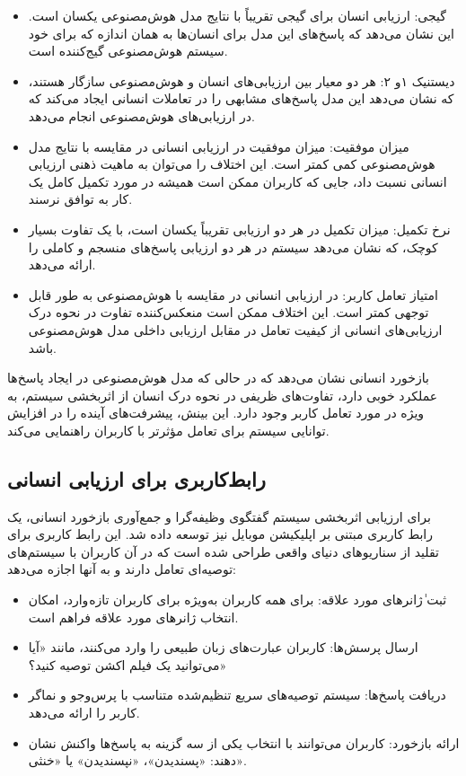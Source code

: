 \begin{itemize}
\item
گیجی: ارزیابی انسان برای گیجی تقریباً با نتایج مدل هوش‌مصنوعی یکسان است.
این نشان می‌دهد که پاسخ‌های این مدل برای انسان‌ها به همان اندازه که برای خود سیستم هوش‌مصنوعی گیج‌کننده است.
\item
دیستنیک ۱و ۲: هر دو معیار بین ارزیابی‌های انسان و هوش‌مصنوعی سازگار هستند، که نشان می‌دهد این مدل پاسخ‌های مشابهی را در تعاملات انسانی ایجاد می‌کند که در ارزیابی‌های هوش‌مصنوعی انجام می‌دهد.
\item
میزان موفقیت: میزان موفقیت در ارزیابی انسانی در مقایسه با نتایج مدل هوش‌مصنوعی کمی کمتر است. این اختلاف را می‌توان به ماهیت ذهنی ارزیابی انسانی نسبت داد، جایی که کاربران ممکن است همیشه در مورد تکمیل کامل یک کار به توافق نرسند.
\item
نرخ تکمیل: میزان تکمیل در هر دو ارزیابی تقریباً یکسان است، با یک تفاوت بسیار کوچک، که نشان می‌دهد سیستم در هر دو ارزیابی پاسخ‌های منسجم و کاملی را ارائه می‌دهد.
\item
 امتیاز تعامل کاربر: در ارزیابی انسانی در مقایسه با هوش‌مصنوعی به طور قابل ‌توجهی کمتر است. این اختلاف ممکن است منعکس‌کننده تفاوت در نحوه درک ارزیابی‌های انسانی از کیفیت تعامل در مقابل ارزیابی داخلی مدل هوش‌مصنوعی باشد.
\end{itemize}

بازخورد انسانی نشان می‌دهد که در حالی که مدل هوش‌مصنوعی در ایجاد پاسخ‌ها عملکرد خوبی دارد، تفاوت‌های ظریفی در نحوه درک انسان از اثربخشی سیستم، به ویژه در مورد تعامل کاربر وجود دارد. این بینش، پیشرفت‌های آینده را در افزایش توانایی سیستم برای تعامل مؤثرتر با کاربران راهنمایی می‌کند.

\subsection{رابط‌کاربری برای ارزیابی انسانی}

برای ارزیابی اثربخشی سیستم گفتگوی وظیفه‌گرا و جمع‌آوری بازخورد انسانی، یک رابط کاربری مبتنی بر اپلیکیشن موبایل نیز توسعه داده شد. این رابط کاربری برای تقلید از سناریوهای دنیای واقعی طراحی شده است که در آن کاربران با سیستم‌های توصیه‌ای تعامل دارند و به آنها اجازه می‌دهد:
\begin{itemize}
\item
ثبت ٰژانرهای مورد علاقه: برای همه کاربران به‌ویژه برای کاربران تازه وارد، امکان انتخاب ژانرهای مورد علاقه فراهم است.
\item
 ارسال پرسش‌ها: کاربران عبارت‌های زبان طبیعی را وارد می‌کنند، مانند «آیا می‌توانید یک فیلم اکشن توصیه کنید؟»
\item
 دریافت پاسخ‌ها: سیستم توصیه‌های سریع تنظیم‌شده متناسب با پرس‌و‌جو و نماگر کاربر را ارائه می‌دهد.
\item
 ارائه بازخورد: کاربران می‌توانند با انتخاب یکی از سه گزینه به پاسخ‌ها واکنش نشان دهند: «پسندیدن»، «نپسندیدن» یا «خنثی».
\end{itemize}


